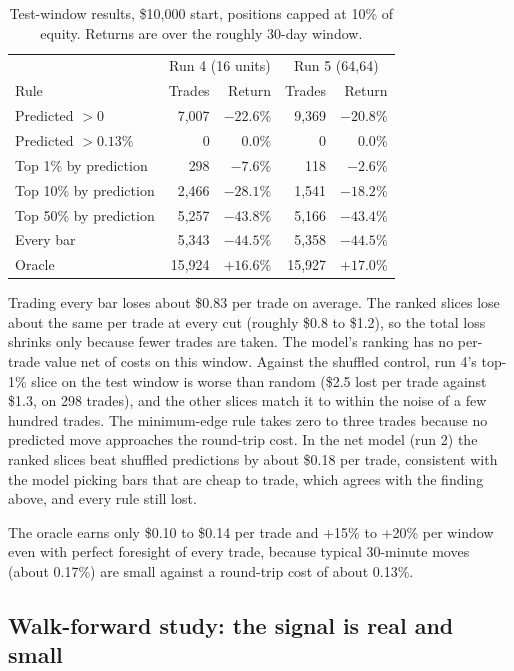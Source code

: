 \documentclass[11pt,a4paper]{article}
\begin{document}
\begin{table}[h]
\centering
\small
\begin{tabular}{@{}lrrrr@{}}
\toprule
 & \multicolumn{2}{c}{Run 4 (16 units)} & \multicolumn{2}{c}{Run 5 (64,64)} \\
Rule & Trades & Return & Trades & Return \\
\midrule
Predicted $>0$          & 7,007 & $-22.6\%$ & 9,369 & $-20.8\%$ \\
Predicted $>0.13\%$      & 0     & $0.0\%$   & 0     & $0.0\%$ \\
Top 1\% by prediction   & 298   & $-7.6\%$  & 118   & $-2.6\%$ \\
Top 10\% by prediction  & 2,466 & $-28.1\%$ & 1,541 & $-18.2\%$ \\
Top 50\% by prediction  & 5,257 & $-43.8\%$ & 5,166 & $-43.4\%$ \\
Every bar               & 5,343 & $-44.5\%$ & 5,358 & $-44.5\%$ \\
Oracle                  & 15,924 & $+16.6\%$ & 15,927 & $+17.0\%$ \\
\bottomrule
\end{tabular}
\caption{Test-window results, \$10,000 start, positions capped at 10\% of
equity. Returns are over the roughly 30-day window.}
\label{tab:trading}
\end{table}

Trading every bar loses about \$0.83 per trade on average. The ranked slices
lose about the same per trade at every cut (roughly \$0.8 to \$1.2), so the
total loss shrinks only because fewer trades are taken. The model's ranking
has no per-trade value net of costs on this window. Against the shuffled control, run 4's
top-1\% slice on the test window is worse than random (\$2.5 lost per trade
against \$1.3, on 298 trades), and the other slices match it to within the
noise of a few hundred trades. The minimum-edge rule takes zero to three
trades because no predicted move approaches the round-trip cost. In the net
model (run 2) the ranked slices beat shuffled predictions by about \$0.18 per
trade, consistent with the model picking bars that are cheap to trade, which
agrees with the finding above, and every rule still lost.

The oracle earns only \$0.10 to \$0.14 per trade and +15\% to +20\% per window
even with perfect foresight of every trade, because typical 30-minute moves
(about 0.17\%) are small against a round-trip cost of about 0.13\%.

\subsection{Walk-forward study: the signal is real and small}
\label{sec:study_results}
\end{document}
